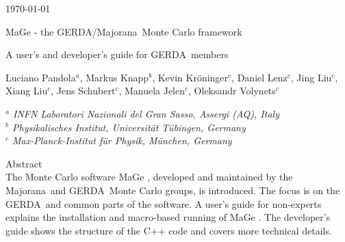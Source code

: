 \documentclass[11pt, a4paper]{book}
\newcommand{\mage}     {{\sc MaGe }}
\newcommand{\gerda}    {{\sc GERDA}}
\newcommand{\majorana} {{\sc Majorana}}
\begin{document}

\begin{titlepage}

\begin{figure}
\end{figure} 

\hspace{10.8cm} \today \\ 

\begin{center}

\vspace{1.0cm}

{\Large MaGe - the \gerda/\majorana\ Monte Carlo framework \\ } 

\vspace{0.5cm} 

{\large A user's and developer's guide for \gerda\ members\\ }

\vspace{1.0cm}

{\large 
Luciano Pandola$^{a}$,
Markus Knapp$^{b}$,
Kevin Kr\"oninger$^{c}$,
Daniel Lenz$^{c}$,
Jing Liu$^{c}$,
Xiang Liu$^{c}$,
Jens Schubert$^{c}$,
Manuela Jelen$^{c}$,
Oleksandr Volynets$^{c}$
}

\vspace{1.0cm}

{\it 
$^{a}$ INFN Laboratori Nazionali del Gran Sasso, Assergi (AQ), Italy \\ 
$^{b}$ Physikalisches Institut, Universit\"at T\"ubingen, Germany \\ 
$^{c}$ Max-Planck-Institut f\"ur Physik, M\"unchen, Germany
} 
\vspace{2.0cm} 

\end{center} 

{\large Abstract} \\ 

The Monte Carlo software \mage, developed and maintained by the
\majorana\ and \gerda\ Monte Carlo groups, is introduced. The focus is
on the \gerda\ and common parts of the software. A user's guide for
non-experts explains the installation and macro-based running of
\mage. The developer's guide shows the structure of the C++ code
and covers more technical details. 

\end{titlepage} 
\end{document}
